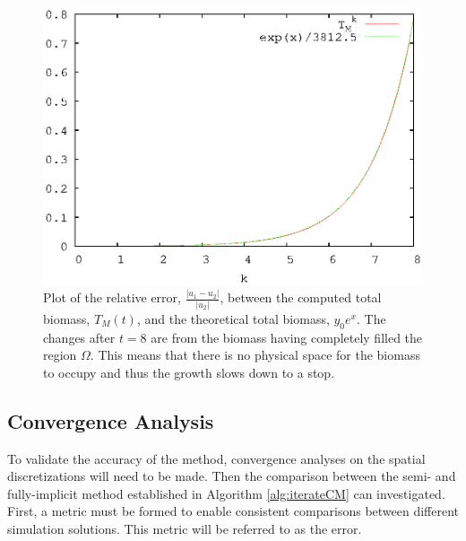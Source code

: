   \begin{figure}
    \centering
    \includegraphics[scale = 0.9]{basic_growth}
    \caption{Plot of the relative error, $\frac{|u_1 - u_2|}{|u_2|}$, between the computed total biomass, $T_{M}(t)$, and the theoretical total biomass, $y_0 e^x$. 
      The changes after $t = 8$ are from the biomass having completely filled the region $\Omega$.
      This means that there is no physical space for the biomass to occupy and thus the growth slows down to a stop.}
    \label{fig:basic_growth}
  \end{figure}
  

\subsection{Convergence Analysis}
  To validate the accuracy of the method, convergence analyses on the spatial discretizations will need to be made. 
  Then the comparison between the semi- and fully-implicit method established in Algorithm \ref{alg:iterateCM} can investigated.
  First, a metric must be formed to enable consistent comparisons between different simulation solutions. 
  This metric will be referred to as the error. %


